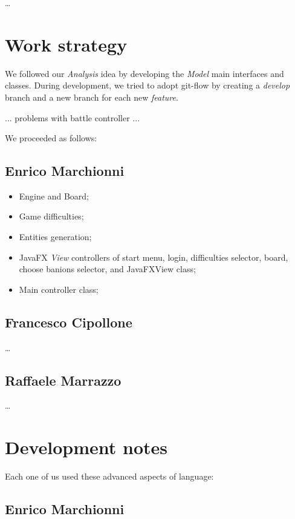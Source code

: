\documentclass[12pt, a4paper]{report}
\begin{document}
    \dots

\section{Work strategy}

    We followed our \emph{Analysis} idea by developing the \emph{Model} main interfaces and classes.
    During development, we tried to adopt git-flow by creating a \emph{develop} branch and a new branch for each new \emph{feature}.

    ... problems with battle controller ...

    We proceeded as follows:

    \subsection*{Enrico Marchionni}

    \begin{itemize}
        \item Engine and Board;
        \item Game difficulties;
        \item Entities generation;
        \item JavaFX \emph{View} controllers of start menu, login, difficulties selector, board, choose banions selector, and JavaFXView class;
        \item Main controller class;
    \end{itemize}

    \subsection*{Francesco Cipollone}

    \dots

    \subsection*{Raffaele Marrazzo}

    \dots

\section{Development notes}

    Each one of us used these advanced aspects of language:

    \subsection*{Enrico Marchionni}
\end{document}
